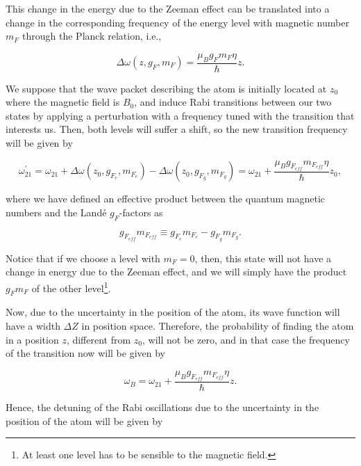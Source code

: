 \documentclass{article}
\begin{document}
This change in the energy due to the Zeeman effect can be translated into a change in the corresponding frequency of the energy level with magnetic number $m_{F}$ through the Planck relation, i.e.,

\begin{equation}
  \Delta \omega(z, g_{F}, m_{F}) = \frac{\mu_{B} g_{F} m_{F} \eta}{\hbar} z.
\end{equation}

We suppose that the wave packet describing the atom is initially located at $z_{0}$ where the magnetic field is $B_{0}$, and induce Rabi transitions between our two states by applying a perturbation with a frequency tuned with the transition that interests us. Then, both levels will suffer a shift, so the new transition frequency will be given by 

\begin{equation}
  \omega_{21}^{\prime} = \omega_{21} + \Delta \omega(z_{0}, g_{F_{e}}, m_{F_{e}}) -  \Delta \omega(z_{0}, g_{F_{g}}, m_{F_{g}}) =  \omega_{21} + \frac{\mu_{B} g_{F_{eff}} m_{F_{eff}} \eta}{\hbar} z_{0},
\end{equation}

where we have defined an effective product between the quantum magnetic numbers and the Landé $g_{F}$-factors as

\begin{equation}
    g_{F_{eff}} m_{F_{eff}} \equiv g_{F_{e}} m_{F_{e}} - g_{F_{g}} m_{F_{g}}.
\end{equation}

Notice that if we choose a level with $m_{F}=0$, then, this state will not have a change in energy due to the Zeeman effect, and we will simply have the product $g_{F} m_{F}$ of the other level\footnote{At least one level has to be sensible to the magnetic field.}.

Now, due to the uncertainty in the position of the atom, its wave function will have a width $\Delta Z$ in position space. Therefore, the probability of finding the atom in a position $z$, different from $z_{0}$, will not be zero, and in that case the frequency of the transition now will be given by

\begin{equation}
  \omega_{B} =  \omega_{21} + \frac{\mu_{B} g_{F_{eff}} m_{F_{eff}} \eta}{\hbar} z.
\end{equation}

Hence, the detuning of the Rabi oscillations due to the uncertainty in the position of the atom will be given by
\end{document}
